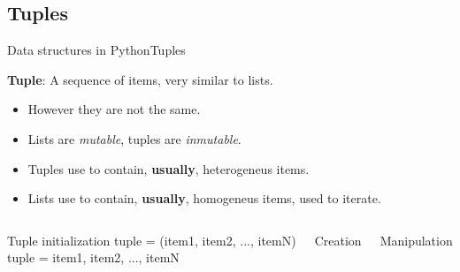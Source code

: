 \documentclass[10pt,compress]{beamer} %
\begin{document}
\subsection{Tuples}
\begin{frame}{Data structures in Python}{Tuples}

	\textbf{Tuple}: A sequence of items, very similar to lists.
		\begin{itemize}
		\item \small However they are not the same.
		\item \small Lists are \textit{mutable}, tuples are \textit{inmutable}.
		\item \small Tuples use to contain, \textbf{usually}, heterogeneus items.
		\item \small Lists use to contain, \textbf{usually}, homogeneus items, used to iterate.
		\end{itemize}
	
	    \begin{columns}
		\begin{block}{Tuple initialization}
        tuple = (item1, item2, ..., itemN)\\
        tuple = item1, item2, ..., itemN
		\end{block}

 	   \scriptsize{
		\begin{exampleblock}{Creation}
		\vspace{-0.2cm}
		
		\vspace{-0.2cm}
		\end{exampleblock}
		}
       \vspace{4cm}
 	   \scriptsize{
		\begin{exampleblock}{Manipulation}
		\vspace{-0.2cm}
		
		\vspace{-0.3cm}	
		\end{exampleblock}
		}
		\vspace{2.9 cm}

	\end{columns}
\end{frame}
\end{document}
